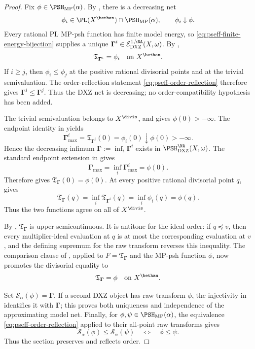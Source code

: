 \begin{proof}
Fix \(\phi\in\PSH_{\mathrm{MP}}(\alpha)\).  By
, there is a decreasing net
\[
 \phi_i\in\PL(X^{\bethan})\cap\PSH_{\mathrm{MP}}(\alpha),
 \qquad \phi_i\downarrow\phi.
\]
Every rational PL MP-psh function has finite model energy, so
\eqref{eq:pseff-finite-energy-bijection} supplies a unique
\(\boldsymbol\Gamma^i\in
\mathcal E^{1,\NA}_{\mathrm{DXZ}}(X,\omega)\).  By
,
\[
                 \mathfrak T_{\boldsymbol\Gamma^i}=\phi_i
                 \quad\text{on }X^{\bethan}.
\]
If \(i\geq j\), then \(\phi_i\leq\phi_j\) at the positive rational
divisorial points and at the trivial semivaluation.  The order-reflection
statement \eqref{eq:pseff-order-reflection} therefore gives
\(\boldsymbol\Gamma^i\leq\boldsymbol\Gamma^j\).  Thus the DXZ net is
decreasing; no order-compatibility hypothesis has been added.

The trivial semivaluation belongs to \(X^{\divis}\), and
 gives \(\phi(0)>-\infty\).  The endpoint
identity in  yields
\[
 \boldsymbol\Gamma^i_{\max}
   =\mathfrak T_{\boldsymbol\Gamma^i}(0)
   =\phi_i(0)\downarrow\phi(0)>-\infty.
\]
Hence the decreasing infimum
\(\boldsymbol\Gamma:=\inf_i\boldsymbol\Gamma^i\) exists in
\(\PSH^{\NA}_{\mathrm{DXZ}}(X,\omega)\).  The standard endpoint extension
in  gives
\[
 \boldsymbol\Gamma_{\max}
   =\inf_i\boldsymbol\Gamma^i_{\max}
   =\phi(0).
\]
Therefore  gives
\(\mathfrak T_{\boldsymbol\Gamma}(0)=\phi(0)\).  At every positive
rational divisorial point \(q\),  gives
\[
 \mathfrak T_{\boldsymbol\Gamma}(q)
   =\inf_i\mathfrak T_{\boldsymbol\Gamma^i}(q)
   =\inf_i\phi_i(q)
   =\phi(q).
\]
Thus the two functions agree on all of \(X^{\divis}\).

By
,
\(\mathfrak T_{\boldsymbol\Gamma}\) is upper semicontinuous.  It is
antitone for the ideal order: if \(q\preceq v\), then every multiplier-ideal
evaluation at \(q\) is at most the corresponding evaluation at \(v\), and
the defining supremum for the raw transform reverses this inequality.
The comparison clause of ,
applied to \(F=\mathfrak T_{\boldsymbol\Gamma}\) and the MP-psh function
\(\phi\), now promotes the divisorial equality to
\[
                 \mathfrak T_{\boldsymbol\Gamma}=\phi
                 \quad\text{on }X^{\bethan}.
\]

Set \(\mathcal S_\alpha(\phi)=\boldsymbol\Gamma\).  If a second DXZ
object has raw transform \(\phi\), the injectivity in
 identifies it with
\(\boldsymbol\Gamma\); this proves both uniqueness and independence of the
approximating model net.  Finally, for \(\phi,\psi\in
\PSH_{\mathrm{MP}}(\alpha)\), the equivalence
\eqref{eq:pseff-order-reflection} applied to their all-point raw transforms
gives
\[
 \mathcal S_\alpha(\phi)\leq\mathcal S_\alpha(\psi)
 \quad\Longleftrightarrow\quad
 \phi\leq\psi.
\]
Thus the section preserves and reflects order.
\end{proof}

